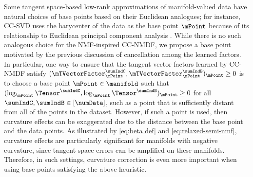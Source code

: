Some tangent space-based low-rank approximations of manifold-valued data have natural choices of base points based on their Euclidean analogues; for instance, CC-SVD uses the barycenter of the data as the base point $\mPoint$ because of its relationship to Euclidean principal component analysis \citep{diepeveen2023curvature}. While there is no such analogous choice for the NMF-inspired CC-NMDF, we propose a base point motivated by the previous discussion of cancellation among the learned factors. In particular, one way to ensure that the tangent vector factors learned by CC-NMDF satisfy $(\mTVectorFactor_\mPoint^\sumIndC, \mTVectorFactor_\mPoint^\sumIndB)_\mPoint \geq 0$ is to choose a base point $\mPoint \in \manifold$ such that $(\log_\mPoint \Tensor^\sumIndC, \log_\mPoint \Tensor^\sumIndB)_\mPoint \geq 0$ for all $\sumIndC, \sumIndB \in [\numData]$, such as a point that is sufficiently distant from all of the points in the dataset. However, if such a point is used, then curvature effects can be exaggerated due to the distance between the base point and the data points. As illustrated by \eqref{eq:beta def} and \eqref{eq:relaxed-semi-nmf}, curvature effects are particularly significant for manifolds with negative curvature, since tangent space errors can be amplified on these manifolds. Therefore, in such settings, curvature correction is even more important when using base points satisfying the above heuristic.

